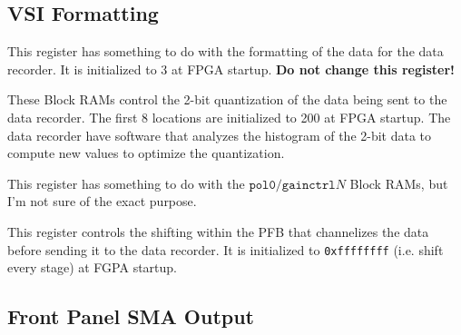 \documentclass[12pt]{article}
\begin{document}
  \subsection{VSI Formatting}

\begin{description}

 This register has something to do with the formatting of the
data for the data recorder.  It is initialized to 3 at FPGA startup.
\textbf{Do not change this register!}

\filbreak
{}
 These Block RAMs control the 2-bit quantization of the
data being sent to the data recorder.  The first 8 locations are initialized
to 200 at FPGA startup.  The data recorder have software that analyzes the
histogram of the 2-bit data to compute new values to optimize the quantization.

 This register has something to do with the
$\mathtt{pol0/gainctrl}N$ Block RAMs, but I'm not sure of the exact purpose.

  This register controls the shifting within the PFB that
channelizes the data before sending it to the data recorder.  It is
initialized to \verb|0xffffffff| (i.e. shift every stage) at FGPA startup.

\end{description}

\filbreak
  \subsection{Front Panel SMA Output}
\end{document}
